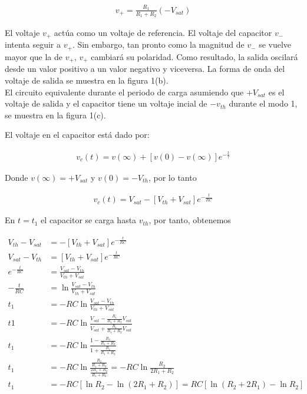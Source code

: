 \documentclass{article}
\begin{document}
\begin{align}
	v_{+} = \frac{R_1}{R_1 + R_2}(-V_{sat})
\end{align}

El voltaje $v_{+}$ actúa como un voltaje de referencia. El voltaje del capacitor $v_{-}$ intenta seguir a $v_{+}$. Sin embargo, tan pronto como la magnitud de $v_{-}$ se vuelve mayor que la de $v_{+}$, $v_{+}$ cambiará su polaridad. Como resultado, la salida oscilará desde un valor positivo a un valor negativo y viceversa. La forma de onda del voltaje de salida se muestra en la figura 1(b). \\

\noindent El circuito equivalente durante el periodo de carga asumiendo que $+V_{sat}$ es el voltaje de salida  y el capacitor tiene un voltaje incial de $-v_{th}$ durante el modo 1, se muestra en la figura 1(c).

\noindent El voltaje en el capacitor está dado por:

\begin{align}
	v_c(t) = v(\infty) + [v(0) - v(\infty)]e^{-\frac{t}{\tau}}
\end{align}

\noindent Donde $v(\infty) = +V_{sat}$ y $v(0) = -V_{th}$, por lo tanto

\begin{align}
	v_c(t) = V_{sat} - [V_{th} + V_{sat}]e^{-\frac{t}{RC}}
\end{align}

\noindent En $t = t_1$ el capacitor se carga hasta $v_{th}$, por tanto, obtenemos

\begin{align}
	V_{th} - V_{sat} &= - [V_{th} + V_{sat}]e^{-\frac{t}{RC}} \nonumber \\
	V_{sat} - V_{th} &= [V_{th} + V_{sat}]e^{-\frac{t}{RC}} \nonumber \\
	e^{-\frac{t}{RC}} &= \frac{V_{sat} - V_{th}}{V_{th} + V_{sat}} \nonumber \\
	-\frac{t}{RC} &= \ln{\frac{V_{sat} - V_{th}}{V_{th} + V_{sat}}} \nonumber \\
	t_1 &= -RC\ln{\frac{V_{sat} - V_{th}}{V_{th} + V_{sat}}} \nonumber \\
	t1 &= -RC\ln{\frac{V_{sat} - \frac{R_1}{R_1 + R_2}V_{sat}}{V_{sat} +\frac{R_1}{R_1 + R_2}V_{sat}}  } \nonumber \\
	t_1 &= -RC \ln {\frac{1 - \frac{R_1}{R_1 + R_2}}{1 + \frac{R_1}{R_1 + R_2}}} \nonumber \\
	t_1 &= -RC \ln{\frac{ \frac{R_2}{R_1 + R_2} }{ \frac{2R_1 + R_2}{R_1 + R_2} }} = -RC \ln{\frac{R_2}{2R_1 + R_2}} \nonumber \\
	t_1 &= -RC \left[ \ln {R_2} - \ln {(2R_1 + R_2)} \right] = RC \left[ \ln {(R_2 + 2R_1)} - \ln{R_2} \right] \nonumber
\end{align}
\end{document}
